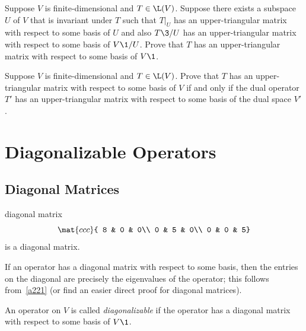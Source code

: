 \begin{exercises}
\exercise
Suppose $V$ is finite-dimensional and $T \in \L(V)$. Suppose there exists a subspace $U$ of $V$ that is invariant under $T$ such that $T|_U$ has an upper-triangular matrix with respect to some basis of $U$ and also $T\3/U$ has an upper-triangular matrix with respect to some basis of $V\1/U$. Prove that $T$ has an upper-triangular matrix with respect to some basis of $V\1$.\label{6Tutm}


\exercise
Suppose $V$ is finite-dimensional and $T \in \L(V)$. Prove that $T$ has an upper-triangular matrix with respect to some basis of $V$ if and only if the dual operator $T'$ has an upper-triangular matrix with respect to some basis of the dual space $V'\!$.


\end{exercises}

\CrCom

\section{Diagonalizable Operators} \label{diagmat}

\subsection{Diagonal Matrices}


\begin{example}[diagmatex]{diagonal matrix}
\vspace{-.15in}
\[
\mat{ccc}{
8 & 0 & 0\\
0 & 5 & 0\\
0 & 0 & 5}
\]
is a diagonal matrix.
\end{example}


If an operator has a diagonal matrix with respect to some basis, then the  entries on the diagonal are precisely the eigenvalues of the operator; this follows from~\ref{a221} (or find an easier direct proof for diagonal matrices).

{An operator on $V$ is called \emph{diagonalizable} if the operator has a diagonal matrix with respect to some basis of $V\1$.}

